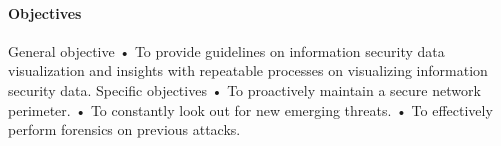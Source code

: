 \documentclass[12pt]{report}
\begin{document}
\paragraph{Objectives}
General objective
•	To provide guidelines on information security data visualization and insights with repeatable processes on visualizing information security data.
Specific objectives
•	To proactively maintain a secure network perimeter.
•	To constantly look out for new emerging threats.
•	To effectively perform forensics on previous attacks.
\end{document}
